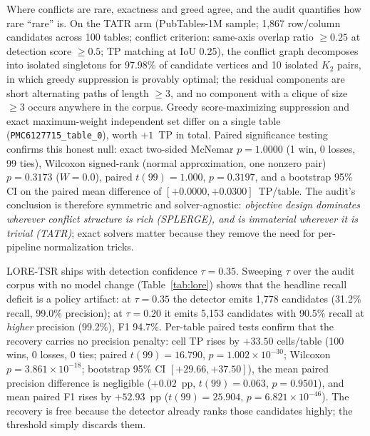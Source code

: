 \documentclass[final,5p,times,twocolumn]{elsarticle}
\begin{document}
Where conflicts are rare, exactness and greed agree, and the audit quantifies
how rare ``rare'' is. On the TATR arm (PubTables-1M sample; 1{,}867 row/column
candidates across 100 tables; conflict criterion: same-axis overlap ratio
$\geq 0.25$ at detection score $\geq 0.5$; TP matching at IoU 0.25), the
conflict graph decomposes into isolated singletons for 97.98\% of candidate
vertices and 10 isolated $K_2$ pairs, in which greedy suppression is provably
optimal; the residual components are short alternating paths of length
$\geq 3$, and no component with a clique of size $\geq 3$ occurs anywhere in
the corpus. Greedy score-maximizing suppression and exact maximum-weight
independent set differ on a single table
(\texttt{PMC6127715\_table\_0}), worth $+1$~TP in total. Paired significance
testing confirms this honest null: exact two-sided McNemar $p = 1.0000$
(1 win, 0 losses, 99 ties), Wilcoxon signed-rank (normal approximation, one nonzero pair) $p = 0.3173$ ($W = 0.0$),
paired $t(99) = 1.000$, $p = 0.3197$, and a bootstrap 95\% CI on the paired
mean difference of $[+0.0000, +0.0300]$~TP/table. The audit's conclusion is
therefore symmetric and
solver-agnostic: \emph{objective design dominates wherever conflict structure
is rich (SPLERGE), and is immaterial wherever it is trivial (TATR)}; exact
solvers matter because they remove the need for per-pipeline normalization
tricks.

LORE-TSR ships with detection confidence $\tau{=}0.35$. Sweeping $\tau$ over
the audit corpus with no model change (Table~\ref{tab:lore}) shows that the
headline recall deficit is a policy artifact: at $\tau{=}0.35$ the detector
emits 1{,}778 candidates (31.2\% recall, 99.0\% precision); at $\tau{=}0.20$
it emits 5{,}153 candidates with 90.5\% recall at \emph{higher} precision
(99.2\%), F1 94.7\%. Per-table paired tests confirm that the recovery
carries no precision penalty: cell TP rises by $+33.50$ cells/table (100
wins, 0 losses, 0 ties; paired $t(99) = 16.790$, $p = 1.002\times 10^{-30}$;
Wilcoxon $p = 3.861\times 10^{-18}$; bootstrap 95\% CI $[+29.66, +37.50]$),
the mean paired precision difference is negligible ($+0.02$~pp, $t(99) =
0.063$, $p = 0.9501$), and mean paired F1 rises by $+52.93$~pp ($t(99) =
25.904$, $p = 6.821\times 10^{-46}$). The
recovery is free because the detector already ranks those candidates highly;
the threshold simply discards them.
\end{document}
